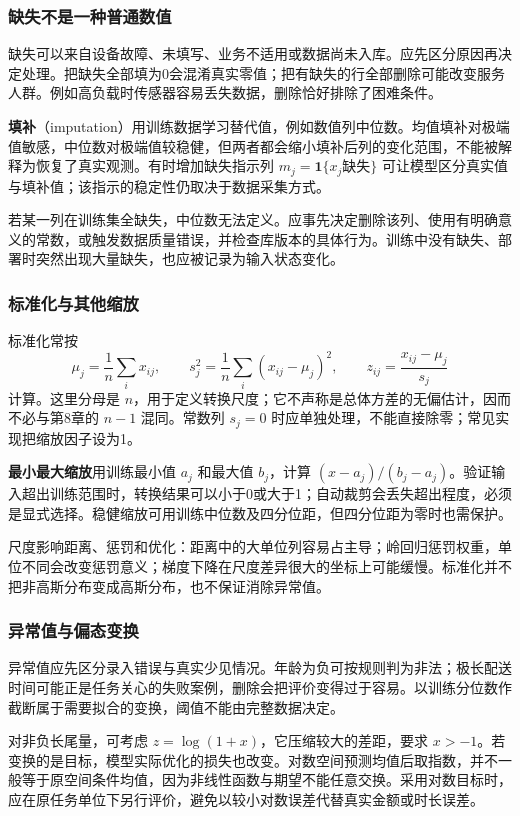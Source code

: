 \documentclass[UTF8,fontset=none,zihao=-4,a4paper]{ctexart}
\newcommand{\term}[1]{\textbf{#1}}
\numberwithin{equation}{section}
\numberwithin{figure}{section}
\begin{document}
\subsubsection{缺失不是一种普通数值}
缺失可以来自设备故障、未填写、业务不适用或数据尚未入库。应先区分原因再决定处理。把缺失全部填为0会混淆真实零值；把有缺失的行全部删除可能改变服务人群。例如高负载时传感器容易丢失数据，删除恰好排除了困难条件。

\term{填补}（imputation）用训练数据学习替代值，例如数值列中位数。均值填补对极端值敏感，中位数对极端值较稳健，但两者都会缩小填补后列的变化范围，不能被解释为恢复了真实观测。有时增加缺失指示列 $m_j=\mathbf1\{x_j\text{缺失}\}$ 可让模型区分真实值与填补值；该指示的稳定性仍取决于数据采集方式。

若某一列在训练集全缺失，中位数无法定义。应事先决定删除该列、使用有明确意义的常数，或触发数据质量错误，并检查库版本的具体行为。训练中没有缺失、部署时突然出现大量缺失，也应被记录为输入状态变化。

\subsubsection{标准化与其他缩放}
标准化常按
\[
 \mu_j=\frac1n\sum_i x_{ij},\qquad
 s_j^2=\frac1n\sum_i(x_{ij}-\mu_j)^2,\qquad
 z_{ij}=\frac{x_{ij}-\mu_j}{s_j}
\]
计算。这里分母是 $n$，用于定义转换尺度；它不声称是总体方差的无偏估计，因而不必与第8章的 $n-1$ 混同。常数列 $s_j=0$ 时应单独处理，不能直接除零；常见实现把缩放因子设为1。

\term{最小最大缩放}用训练最小值 $a_j$ 和最大值 $b_j$，计算 $(x-a_j)/(b_j-a_j)$。验证输入超出训练范围时，转换结果可以小于0或大于1；自动裁剪会丢失超出程度，必须是显式选择。稳健缩放可用训练中位数及四分位距，但四分位距为零时也需保护。

尺度影响距离、惩罚和优化：距离中的大单位列容易占主导；岭回归惩罚权重，单位不同会改变惩罚意义；梯度下降在尺度差异很大的坐标上可能缓慢。标准化并不把非高斯分布变成高斯分布，也不保证消除异常值。

\subsubsection{异常值与偏态变换}
异常值应先区分录入错误与真实少见情况。年龄为负可按规则判为非法；极长配送时间可能正是任务关心的失败案例，删除会把评价变得过于容易。以训练分位数作截断属于需要拟合的变换，阈值不能由完整数据决定。

对非负长尾量，可考虑 $z=\log(1+x)$，它压缩较大的差距，要求 $x>-1$。若变换的是目标，模型实际优化的损失也改变。对数空间预测均值后取指数，并不一般等于原空间条件均值，因为非线性函数与期望不能任意交换。采用对数目标时，应在原任务单位下另行评价，避免以较小对数误差代替真实金额或时长误差。
\end{document}
